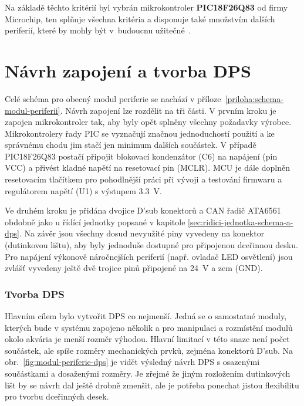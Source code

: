         Na základě těchto kritérií byl vybrán mikrokontroler \textbf{PIC18F26Q83} od firmy Microchip, ten splňuje všechna kritéria a disponuje také množstvím dalších periferií, které by mohly být v~budoucnu užitečné~\cite{PIC18F26Q83}.

    \section{Návrh zapojení a tvorba DPS}
        Celé schéma pro obecný modul periferie se nachází v příloze~\ref{priloha:schema-modul-periferii}. Návrh zapojení lze rozdělit na tři části. V prvním kroku je zapojen mikrokontroler tak, aby byly opět splněny všechny požadavky výrobce. Mikrokontrolery řady PIC se vyznačují značnou jednoduchostí použití a ke správnému chodu jim stačí jen minimum dalších součástek. V případě PIC18F26Q83 postačí připojit blokovací kondenzátor (C6) na napájení (pin VCC) a přivést kladné napětí na resetovací pin (MCLR). MCU je dále doplněn resetovacím tlačítkem pro pohodlnější práci při vývoji a testování firmwaru a regulátorem napětí (U1) s výstupem \qty{3.3}{V}. 

        Ve druhém kroku je přidána dvojice D'sub konektorů a CAN řadič ATA6561 obdobně jako u řídící jednotky popsané v kapitole \ref{sec:ridici-jednotka-schema-a-dps}. Na závěr jsou všechny dosud nevyužité piny vyvedeny na konektor (dutinkovou lištu), aby byly jednoduše dostupné pro připojenou dceřinnou desku. Pro napájení výkonově náročnejších periferií (např. ovladač LED osvětlení) jsou zvlášť vyvedeny ještě dvě trojice pinů připojené na \qty{24}{V} a zem (GND).

        \subsubsection{Tvorba DPS}
        Hlavním cílem bylo vytvořit DPS co nejmenší. Jedná se o samostatné moduly, kterých bude v systému zapojeno několik a pro manipulaci a rozmístění modulů okolo akvária je menší rozměr výhodou. Hlavní limitací v této snaze není počet součástek, ale spíše rozměry mechanických prvků, zejména konektorů D'sub. Na obr.~\ref{fig:modul-periferie-dps} je vidět výsledný návrh DPS s osazenými součástkami a dosaženými rozměry. Je zřejmé že jiným rozložením dutinkových lišt by se návrh dal ještě drobně zmenšit, ale je potřeba ponechat jistou flexibilitu pro tvorbu dceřinných desek.

